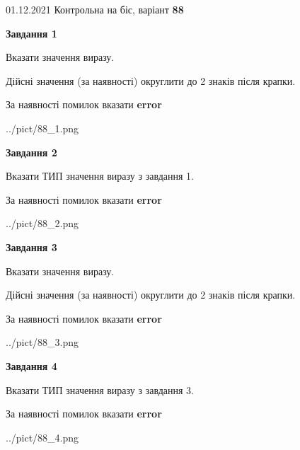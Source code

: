\documentclass[11pt, ukrainian]{article}
\begin{document}
{01.12.2021 Контрольна на біс, варіант  \No \textbf { 88 }\par}
{
\begin {large}
{\begin {center}\textbf{Завдання 1}\end {center}}\par
Вказати значення виразу. \par
Дійсні значення (за наявності) округлити до 2 знаків після крапки. \par
За наявності помилок вказати \textbf{error}

\begin{center}
	{../pict/88_1.png}
\end{center}
\newpage

{\begin {center}\textbf{Завдання 2}\end {center}}\par
Вказати ТИП значення виразу з завдання 1. \par
За наявності помилок вказати \textbf{error}

\begin{center}
	{../pict/88_2.png}
\end{center}
\newpage

{\begin {center}\textbf{Завдання 3}\end {center}}\par
Вказати значення виразу. \par
Дійсні значення (за наявності) округлити до 2 знаків після крапки. \par
За наявності помилок вказати \textbf{error}

\begin{center}
	{../pict/88_3.png}
\end{center}
\newpage

{\begin {center}\textbf{Завдання 4}\end {center}}\par
Вказати ТИП значення виразу з завдання 3. \par
За наявності помилок вказати \textbf{error}

\begin{center}
	{../pict/88_4.png}
\end{center}
\newpage


\end{large}}
\end{document}
